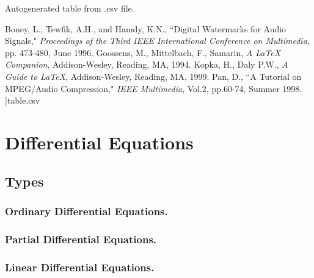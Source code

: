 \documentclass[12pt]{article}
\begin{document}
	\begin{table}[h!]
		\begin{center}
			\caption{Autogenerated table from .csv file.}
			\label{table1}
			\pgfplotstabletypeset[
			multicolumn names, %
			col sep=semicolon, %
			display columns/0/.style={
				column name=$Height$, %
				column type={S},string type},  %
			display columns/1/.style={
				column name=$Number of girls$,
				column type={S},string type},
			every head row/.style={
				before row={\toprule}, %
				after row={
					\cm & \count\\ %
					\midrule} %
			},
			every last row/.style={after row=\bottomrule}, %
\addtolength{\leftmargin}{0.2in} %
\setlength{\itemindent}{-0.2in}
\bibitem[Bon96]{Boney96} Boney, L., Tewfik, A.H., and Hamdy, K.N., ``Digital
Watermarks for Audio Signals," \emph{Proceedings of the Third IEEE
	International Conference on Multimedia}, pp. 473-480, June 1996.
 Goossens, M., Mittelbach, F., Samarin, \emph{A LaTeX
	Companion}, Addison-Wesley, Reading, MA, 1994.
 Kopka, H., Daly P.W., \emph{A Guide to LaTeX},
Addison-Wesley, Reading, MA, 1999.
 Pan, D., ``A Tutorial on MPEG/Audio Compression,"
\emph{IEEE Multimedia}, Vol.2, pp.60-74, Summer 1998.	]{table.csv} %
		\end{center}
	\end{table}
	\newpage
	\section{Differential Equations}
	\subsection{Types}
	\subsubsection{Ordinary Differential Equations.}
	\subsubsection{Partial Differential Equations.}
	\subsubsection{Linear Differential Equations.}
\end{document}
